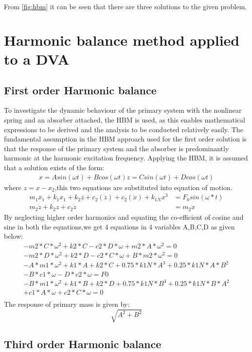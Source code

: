 From \ref{fig:hbm} it can be seen that there are three solutions to the given problem.

\section{Harmonic balance method applied to a DVA}
\subsection{First order Harmonic balance}
To investigate the dynamic behaviour of the primary system with the nonlinear spring and an absorber attached, the HBM is used, as this enables mathematical expressions to be derived and the analysis to be conducted relatively easily. The fundamental assumption in the HBM approach used for the first order solution is that the response of the primary system and the absorber is predominantly harmonic at the harmonic excitation frequency. Applying the HBM, it is assumed that a solution exists of the form:
\begin{align}
x=Asin(\omega t)+Bcos(\omega t)
z=Csin(\omega t)+Dcos(\omega t)
\end{align}
where $z=x-x_2$,this two equations are substituted into equation of motion.
\begin{align}
m_1\ddot{x_1}+k_1x_1+k_2z+c_2(\dot{z})+c_2(\dot{x})+k_{1N}x^3&=F_0sin(\omega *t) \\
m_2\ddot{z}+k_2z+c_{2}\dot{z}&=m_2\ddot{x}
\end{align}
By neglecting higher order harmonics and equating the co-efficient of cosine and sine in both the equations,we get 4  equations in 4 variables A,B,C,D as given below:
\begin{align}
-m2*C*\omega^2 + k2*C - c2*D*\omega + m2*A*\omega^2 = 0\\
-m2*D*\omega^2 + k2*D - c2*C*\omega + B*m2*\omega^2 = 0\\
-A*m1*\omega^2 + k1*A + k2*C + 0.75*k1N*A^3 + 0.25*k1N*A*B^2 \\- B*c1*\omega - D*c2*\omega = F0\\
-B*m1*\omega^2 + k1*B + k2*D + 0.75*k1N*B^3 + 0.25*k1N*B*A^2 \\ + c1*A*\omega + c2*C*\omega = 0\\
\end{align}
The response of primary mass is given by:$$\sqrt{A^2+B^2}$$
\subsection{Third order Harmonic balance}

